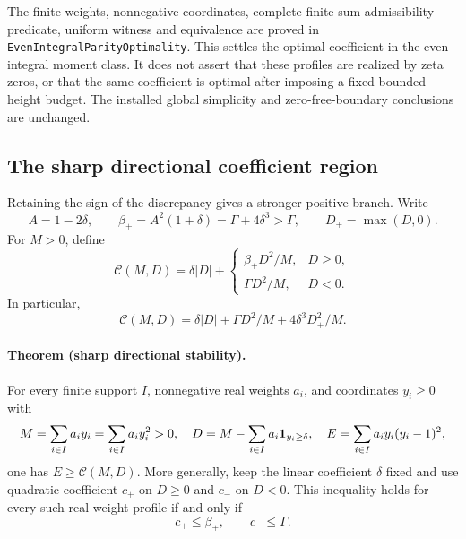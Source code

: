 The finite weights, nonnegative coordinates, complete finite-sum
admissibility predicate, uniform witness and equivalence are proved in
\texttt{EvenIntegralParityOptimality}.
This settles the optimal coefficient in the even integral moment class.
It does not assert that these profiles are realized by zeta zeros, or
that the same coefficient is optimal after imposing a fixed bounded
height budget.  The installed global simplicity and zero-free-boundary
conclusions are unchanged.

\subsection{The sharp directional coefficient region}
\label{sec:directional-parity-stability}

Retaining the sign of the discrepancy gives a stronger positive branch.
Write
\[
 A=1-2\delta,\qquad
 \beta_+=A^2(1+\delta)=\Gamma+4\delta^3>\Gamma,
 \qquad D_+=\max(D,0).
\]
For \(M>0\), define
\[
 \mathcal C(M,D)=\delta|D|+
 \begin{cases}
   \beta_+D^2/M,&D\ge0,\\
   \Gamma D^2/M,&D<0.
 \end{cases}
\]
In particular,
\begin{equation}\label{eq:directional-exact-gain}
 \mathcal C(M,D)
 =\delta|D|+\Gamma D^2/M+4\delta^3D_+^2/M.
\end{equation}

\paragraph{Theorem (sharp directional stability).}
For every finite support \(I\), nonnegative real weights \(a_i\), and
coordinates \(y_i\ge0\) with
\[
 M=\sum_{i\in I}a_i y_i=\sum_{i\in I}a_i y_i^2>0,
 \quad
 D=M-\sum_{i\in I}a_i{\bf1}_{y_i\ge\delta},
 \quad
 E=\sum_{i\in I}a_i y_i(y_i-1)^2,
\]
one has \(E\ge\mathcal C(M,D)\).
More generally, keep the linear coefficient \(\delta\) fixed and use
quadratic coefficient \(c_+\) on \(D\ge0\) and \(c_-\) on \(D<0\).
This inequality holds for every such real-weight profile if and only if
\begin{equation}\label{eq:directional-coefficient-region}
 c_+\le\beta_+,\qquad c_-\le\Gamma.
\end{equation}

